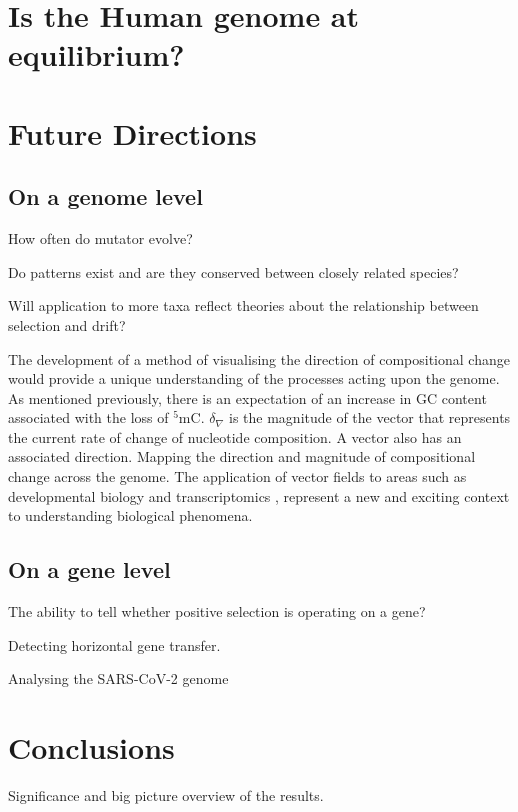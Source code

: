 \section{Is the Human genome at equilibrium?}

\section{Future Directions}

\subsection{On a genome level}
How often do mutator evolve? 

Do patterns exist and are they conserved between closely related species?

Will application to more taxa reflect theories about the relationship between selection and drift?

The development of a method of visualising the direction of compositional change would provide a unique understanding of the processes acting upon the genome. As mentioned previously, there is an expectation of an increase in GC content associated with the loss of $^5$mC. $\delta_\nabla$ is the magnitude of the vector that represents the current rate of change of nucleotide composition. A vector also has an associated direction. Mapping the direction and magnitude of compositional change across the genome. The application of vector fields to areas such as developmental biology \citep{Steiner2009VectorEmbryogeny} and transcriptomics \citep{Qiu2021MappingCells}, represent a new and exciting context to understanding biological phenomena. 

\subsection{On a gene level}

The ability to tell whether positive selection is operating on a gene?

Detecting horizontal gene transfer. 

Analysing the SARS-CoV-2 genome

\section{Conclusions}

Significance and big picture overview of the results.
